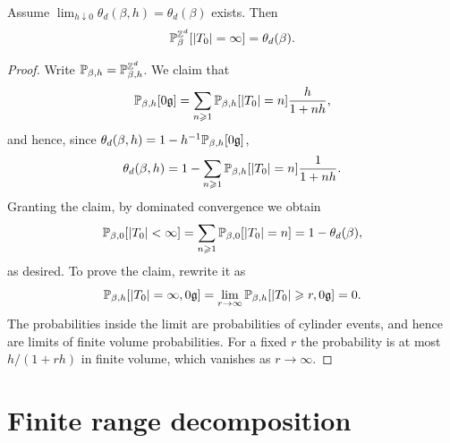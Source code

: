 \documentclass[11pt]{amsart}
\numberwithin{equation}{section}
\numberwithin{theorem}{section}
\newcommand{\ghost}{\mathfrak{g}}
\newcommand{\1}{{\bf 1}}
\begin{document}
\begin{proposition}
  \label{prop:theta}
  Assume $\lim_{h\downarrow 0}\theta_{d}(\beta,h)=\theta_{d}(\beta)$
  exists. Then
  \begin{equation}
    \label{eq:theta}
    \P^{\Z^d}_{\beta}[|T_{0}|=\infty] = \theta_{d}(\beta).
  \end{equation}
\end{proposition}
\begin{proof}
  Write $\P_{\beta,h}=\P^{\Z^d}_{\beta,h}$. We claim that
  \begin{equation}
    \P_{\beta,h}[0\ghost] = \sum_{n\geq 1} \P_{\beta,h}[|T_{0}|=n] \frac{h}{1+nh},
  \end{equation}
  and hence, since $\theta_{d}(\beta,h) = 1-h^{-1}\P_{\beta,h}[0\ghost]$,
  \begin{equation}
    \theta_{d}(\beta,h) = 1-\sum_{n\geq 1} \P_{\beta,h}[|T_{0}|=n] \frac{1}{1+nh}.
  \end{equation}
  Granting the claim, by dominated convergence we obtain
  \begin{equation}
    \P_{\beta,0}[|T_{0}|<\infty] = \sum_{n\geq 1}\P_{\beta,0}[|T_{0}|=n]=1-\theta_{d}(\beta),
  \end{equation}
  as desired. To prove the claim, rewrite it as
  \begin{equation}
    \P_{\beta,h}[|T_{0}|=\infty, 0\ghost]=\lim_{r\to\infty}\P_{\beta,h}[|T_{0}|\geq r, 0\ghost]=0.
  \end{equation}
  The probabilities inside the limit are probabilities of cylinder
  events, and hence are limits of finite volume probabilities. For a
  fixed $r$ the probability is at most $h/(1+rh)$ in finite volume,
  which vanishes as $r\to\infty$.
\end{proof}


\section{Finite range decomposition}
\label{app:decomp}
\end{document}
